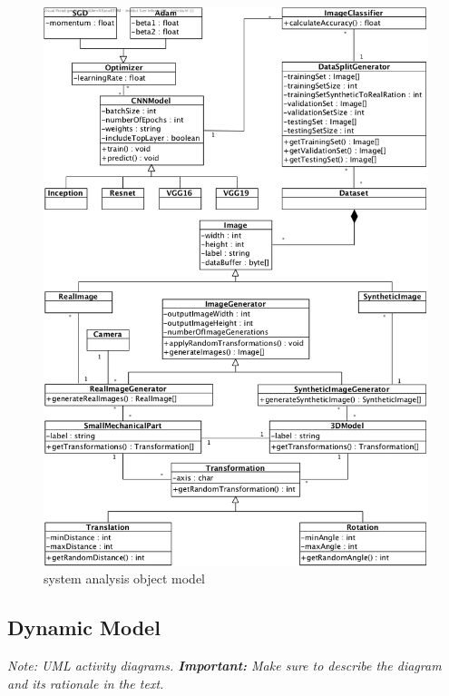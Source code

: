 \documentclass[a4paper,12pt,twoside]{report}
\begin{document}
\begin{figure}[t]
\centering
  \includegraphics[width=\textwidth]{AOM}
\caption{system analysis object model}
\label{fig:AOM}
\end{figure}

\subsection{Dynamic Model}

\textit{Note: UML activity diagrams. \textbf{Important:} Make sure to describe the diagram and its rationale in the text.}










\end{document}
